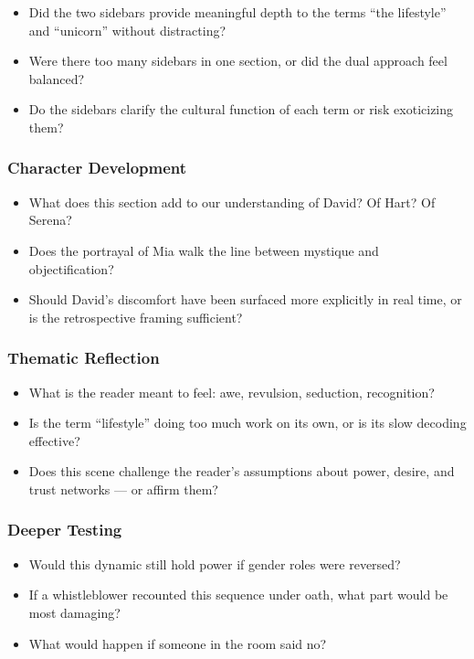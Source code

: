 \begin{itemize}
  \item Did the two sidebars provide meaningful depth to the terms “the lifestyle” and “unicorn” without distracting?
  \item Were there too many sidebars in one section, or did the dual approach feel balanced?
  \item Do the sidebars clarify the cultural function of each term or risk exoticizing them?
\end{itemize}

\subsubsection*{Character Development}

\begin{itemize}
  \item What does this section add to our understanding of David? Of Hart? Of Serena?
  \item Does the portrayal of Mia walk the line between mystique and objectification?
  \item Should David’s discomfort have been surfaced more explicitly in real time, or is the retrospective framing sufficient?
\end{itemize}

\subsubsection*{Thematic Reflection}

\begin{itemize}
  \item What is the reader meant to feel: awe, revulsion, seduction, recognition?
  \item Is the term “lifestyle” doing too much work on its own, or is its slow decoding effective?
  \item Does this scene challenge the reader’s assumptions about power, desire, and trust networks — or affirm them?
\end{itemize}

\subsubsection*{Deeper Testing}

\begin{itemize}
  \item Would this dynamic still hold power if gender roles were reversed?
  \item If a whistleblower recounted this sequence under oath, what part would be most damaging?
  \item What would happen if someone in the room said no?
\end{itemize}
